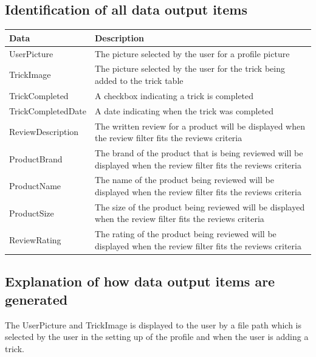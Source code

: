 \subsection{Identification of all data output items}



\begin{center}
\begin{tabular}{|p{3cm}|p{5cm}|} \hline
\textbf{Data} & \textbf{Description} \\ \hline
UserPicture & The picture selected by the user for a profile picture \\ \hline
TrickImage & The picture selected by the user for the trick being added to the trick table \\ \hline
TrickCompleted & A checkbox indicating a trick is completed \\ \hline
TrickCompletedDate & A date indicating when the trick was completed \\ \hline
ReviewDescription & The written review for a product will be displayed when the review filter fits the reviews criteria \\ \hline
ProductBrand & The brand of the product that is being reviewed  will be displayed when the review filter fits the reviews criteria\\ \hline
ProductName & The name of the product being reviewed  will be displayed when the review filter fits the reviews criteria\\ \hline
ProductSize & The size of the product being reviewed  will be displayed when the review filter fits the reviews criteria\\ \hline
ReviewRating & The rating of the product being reviewed  will be displayed when the review filter fits the reviews criteria\\ \hline




\end{tabular}
\label{tab:Output Items}
\end{center}


\subsection{Explanation of how data output items are generated}

The UserPicture and TrickImage is displayed to the user by a file path which is selected by the user in the setting up of the profile and when the user is adding a trick.

